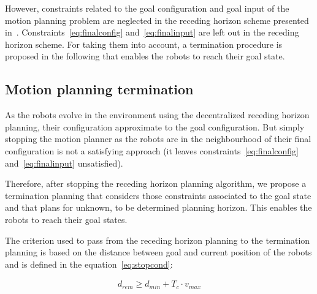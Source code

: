 \documentclass[eprint]{actapoly}
\begin{document}
However, constraints related to the goal configuration and goal input of the motion planning problem are
neglected in the receding horizon scheme presented in~\cite{Defoort2007a}.
Constraints~\ref{eq:finalconfig} and~\ref{eq:finalinput} are left out
in the receding horizon scheme.
For taking them into account, a termination procedure is proposed in the following that enables the robots to reach their goal state.



\subsection{Motion planning termination}



As the robots evolve in the environment using the decentralized receding horizon planning, their configuration approximate to the goal configuration.
But simply stopping the motion planner as the robots are in the neighbourhood 
of their final configuration is not a satisfying approach (it leaves 
constraints~\ref{eq:finalconfig} and~\ref{eq:finalinput} unsatisfied).


Therefore, after stopping the receding horizon planning algorithm, we propose a 
termination planning that considers those constraints associated to 
the goal state
and that plans for unknown, to be determined planning horizon. This enables
the robots to reach their goal states.


The criterion used to pass from the receding 
horizon planning to the termination planning is based on the distance between
goal and current position of the robots and is defined in the
equation~\ref{eq:stopcond}:

\begin{align}\label{eq:stopcond}
  d_{rem} \geq d_{min} + T_c \cdot v_{max}
\end{align}
\end{document}
